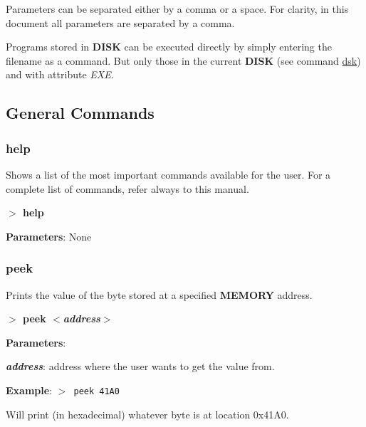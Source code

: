 \documentclass[a4paper,11pt]{article}
\begin{document}
    Parameters can be separated either by a comma or a space. For clarity, in
    this document all parameters are separated by a comma.

    Programs stored in \textbf{DISK} can be executed directly by simply entering
    the filename as a command. But only those in the current \textbf{DISK} (see
    command \hyperref[cmd:dsk]{dsk}) and with attribute \textit{EXE}.

    \subsection{General Commands}\label{gencmds}
        \subsubsection{{\color{blue}help}}
        Shows a list of the most important commands available for the user.
        For a complete list of commands, refer always to this manual.

        \hspace{1.9cm}\textbf{$>$ help}

        \textbf{Parameters}: None

        \subsubsection{{\color{blue}peek}}
        Prints the value of the byte stored at a specified \textbf{MEMORY}
        address.

        \hspace{1.9cm}\textbf{$>$ peek \textit{$<$address$>$}}

        \textbf{Parameters}:

        \hspace{1cm}\textbf{\textit{address}}: address where the user wants
        to get the value from.

        \textbf{Example}: \texttt{$>$ peek 41A0}

        Will print (in hexadecimal) whatever byte is at location 0x41A0.
\end{document}
